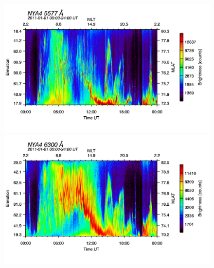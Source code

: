 \begin{figure}
\begin{minipage}{0.49\textwidth}
\includegraphics[width=1\linewidth]{Figures/Allsky/5577/nya4_20110101_0000_2400_5577_cal.png}
\end{minipage}
\begin{minipage}{0.49\textwidth}
\includegraphics[width=1\linewidth]{Figures/Allsky/6300/nya4_20110101_0000_2400_6300_cal.png}
\end{minipage}


\end{figure}
